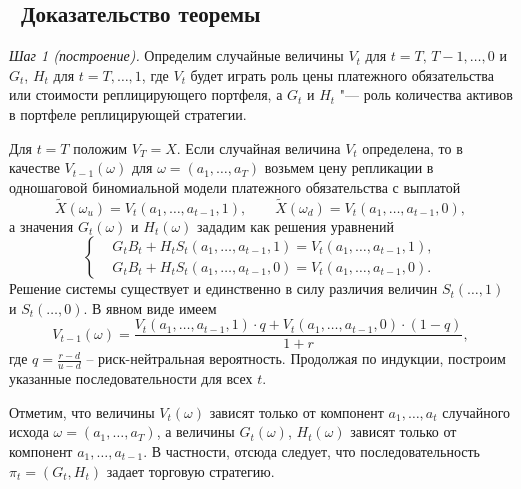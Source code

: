 \subsection{\difficult\ Доказательство теоремы}
\textit{Шаг 1 (построение).}
Определим случайные величины $V_t$ для $t=T,\,T-1,\ldots,0$ и $G_t$, $H_t$ для $t=T,\ldots,1$, где $V_t$ будет играть роль цены платежного обязательства или стоимости реплицирующего портфеля, а $G_t$ и $H_t$ "--- роль количества активов в портфеле реплицирующей стратегии.

Для $t=T$ положим $V_T = X$.
Если случайная величина $V_t$ определена, то в качестве $V_{t-1}(\omega)$ для $\omega=(a_1,\dots,a_T)$ возьмем цену репликации в одношаговой биномиальной модели платежного обязательства с выплатой
\[
\tilde X(\omega_u) = V_{t}(a_1,\ldots,a_{t-1}, 1), \qquad
\tilde X(\omega_d) = V_{t}(a_1,\ldots,a_{t-1}, 0),
\]
а значения $G_{t}(\omega)$ и $H_{t}(\omega)$ зададим как решения уравнений 
\begin{equation}
\label{crr:replication-step}
\left\{
\begin{aligned}
&G_t B_t + H_t S_t(a_1,\ldots,a_{t-1}, 1) = V_{t}(a_1,\ldots,a_{t-1}, 1),\\
&G_t B_t + H_t S_t(a_1,\ldots,a_{t-1}, 0) = V_{t}(a_1,\ldots,a_{t-1}, 0).
\end{aligned}
\right.
\end{equation}
Решение системы существует и единственно в силу различия величин $S_t(\ldots, 1)$ и $S_t(\ldots,0)$.
В явном виде имеем
\begin{equation}
\label{crr:v-by-backward-induction}
V_{t-1}(\omega) 
= \frac
  {V_t(a_1,\ldots,a_{t-1}, 1)\cdot q + V_t(a_1,\ldots,a_{t-1}, 0)\cdot (1-q)}
  {1+r} ,
\end{equation}
где $q= \frac{r-d}{u-d}$ -- риск-нейтральная вероятность.
Продолжая по индукции, построим указанные последовательности для всех $t$. 

Отметим, что величины $V_t(\omega)$ зависят только от компонент $a_1,\ldots,a_t$ случайного исхода $\omega=(a_1,\dots,a_T)$, а величины $G_t(\omega)$, $H_t(\omega)$ зависят только от компонент $a_1,\ldots,a_{t-1}$.
В частности, отсюда следует, что последовательность $\pi_t=(G_t,H_t)$ задает торговую стратегию.

